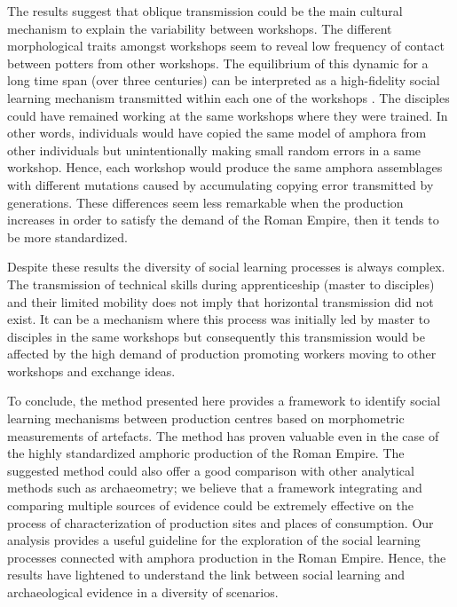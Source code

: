 \documentclass[review]{elsarticle}
\begin{document}

The results suggest that oblique transmission could be the main cultural mechanism to explain the variability between workshops. The different morphological traits amongst workshops seem to reveal low frequency of contact between potters from other workshops. The equilibrium of this dynamic for a long time span (over three centuries) can be interpreted as a high-fidelity social learning mechanism transmitted within each one of the workshops \citep{schillinger_copying_2016}. The disciples could have remained working at the same workshops where they were trained. In other words, individuals would have copied the same model of amphora from other individuals but unintentionally making small random errors in a same workshop. Hence, each workshop would produce the same amphora assemblages with different mutations caused by accumulating copying error transmitted by generations. These differences seem less remarkable when the production increases in order to satisfy the demand of the Roman Empire, then it tends to be more standardized. 

Despite these results the diversity of social learning processes is always complex. The transmission of technical skills during apprenticeship (master to disciples) and their limited mobility does not imply that horizontal transmission did not exist. It can be a mechanism where this process was initially led by master to disciples in the same workshops but consequently this transmission would be affected by the high demand of production promoting workers moving to other workshops and exchange ideas. 

To conclude, the method presented here provides a framework to identify social learning mechanisms between production centres based on morphometric measurements of artefacts. The method has proven valuable even in the case of the highly standardized amphoric production of the Roman Empire. The suggested method could also offer a good comparison with other analytical methods such as archaeometry; we believe that a framework integrating and comparing multiple sources of evidence could be extremely effective on the process of characterization of production sites and places of consumption. Our analysis provides a useful guideline for the exploration of the social learning processes connected with amphora production in the Roman Empire. Hence, the results have lightened to understand the link between social learning and archaeological evidence in a diversity of scenarios. 
 
\end{document}
